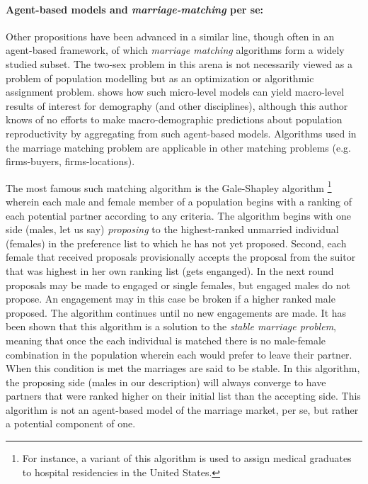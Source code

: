 \paragraph{Agent-based models and \textit{marriage-matching} per se: } Other
propositions have been advanced in a similar line\citep{jacquemet2011marriage, Dagsvik1998report},
though often in an agent-based framework, of which \textit{marriage matching}
 algorithms form a widely studied subset. The two-sex problem in this
arena is not necessarily viewed as a problem of population modelling but as an
optimization or algorithmic assignment problem. \citet{dagsvik2000aggregation}
shows how such micro-level models can yield macro-level results of interest for
demography (and other disciplines), although this author knows of no efforts to
make macro-demographic predictions about population reproductivity by
aggregating from such agent-based models. Algorithms used in 
the marriage matching problem are applicable in other matching problems (e.g.
firms-buyers, firms-locations). 

The most famous such matching algorithm is
the Gale-Shapley algorithm \citep{gale1962college}\footnote{For instance, a variant of this algorithm is used 
to assign medical graduates to hospital residencies in the United States.}
wherein each male and female member of a population begins with a ranking of
each potential partner according to any criteria. The algorithm begins with one
side (males, let us say) \textit{proposing} to the
highest-ranked unmarried individual (females) in the preference list to which
he has not yet proposed. Second, each female that received proposals
provisionally accepts the proposal from the suitor that was highest in her own
ranking list (gets enganged). In the next round proposals may be made to engaged
or single females, but engaged males do not propose. An engagement may in this
case be broken if a higher ranked male proposed. The algorithm continues until
no new engagements are made. It has been shown that this algorithm is a solution
to the \textit{stable marriage problem}, meaning that once the each individual
is matched there is no male-female combination in the population wherein each
would prefer to leave their partner. When this condition is met the marriages
are said to be stable. In this algorithm, the proposing side (males in our
description) will always converge to have partners that were ranked higher on
their initial list than the accepting side. This algorithm is not an agent-based
model of the marriage market, per se, but rather a potential component of one.

